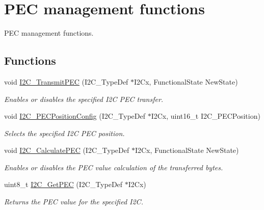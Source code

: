 \hypertarget{group___i2_c___group3}{}\section{P\+EC management functions}
\label{group___i2_c___group3}


P\+EC management functions.  


\subsection*{Functions}
\begin{DoxyCompactItemize}
\item 
void \mbox{\hyperlink{group___i2_c___group3_gaa27d1440290fe601e730b6980999afe3}{I2\+C\+\_\+\+Transmit\+P\+EC}} (I2\+C\+\_\+\+Type\+Def $\ast$I2\+Cx, Functional\+State New\+State)
\begin{DoxyCompactList}\small\item\em Enables or disables the specified I2C P\+EC transfer. \end{DoxyCompactList}\item 
void \mbox{\hyperlink{group___i2_c___group3_ga5d0f939bdd45542502827bf408f24161}{I2\+C\+\_\+\+P\+E\+C\+Position\+Config}} (I2\+C\+\_\+\+Type\+Def $\ast$I2\+Cx, uint16\+\_\+t I2\+C\+\_\+\+P\+E\+C\+Position)
\begin{DoxyCompactList}\small\item\em Selects the specified I2C P\+EC position. \end{DoxyCompactList}\item 
void \mbox{\hyperlink{group___i2_c___group3_gae86801251359226c35745e0a258388b0}{I2\+C\+\_\+\+Calculate\+P\+EC}} (I2\+C\+\_\+\+Type\+Def $\ast$I2\+Cx, Functional\+State New\+State)
\begin{DoxyCompactList}\small\item\em Enables or disables the P\+EC value calculation of the transferred bytes. \end{DoxyCompactList}\item 
uint8\+\_\+t \mbox{\hyperlink{group___i2_c___group3_ga7bf75e7c27c0e1d73e70fc0e1c7cd1dd}{I2\+C\+\_\+\+Get\+P\+EC}} (I2\+C\+\_\+\+Type\+Def $\ast$I2\+Cx)
\begin{DoxyCompactList}\small\item\em Returns the P\+EC value for the specified I2C. \end{DoxyCompactList}\end{DoxyCompactItemize}


